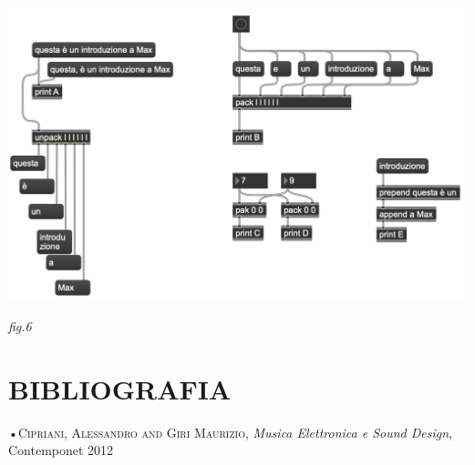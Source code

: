 \documentclass[11pt]{article}
\begin{document}
\begin{multicols*}{2}
\begin{center}
\includegraphics[scale=0.3]{images/06_liste.png}

{\scriptsize \emph{fig.6 }}
\end{center}


\section*{\centering\small{BIBLIOGRAFIA}}
•\textsc{\textsf {Cipriani, Alessandro and Giri Maurizio}}, \emph{Musica Elettronica e Sound Design}, Contemponet 2012\\

\end{multicols*}
\end{document}
